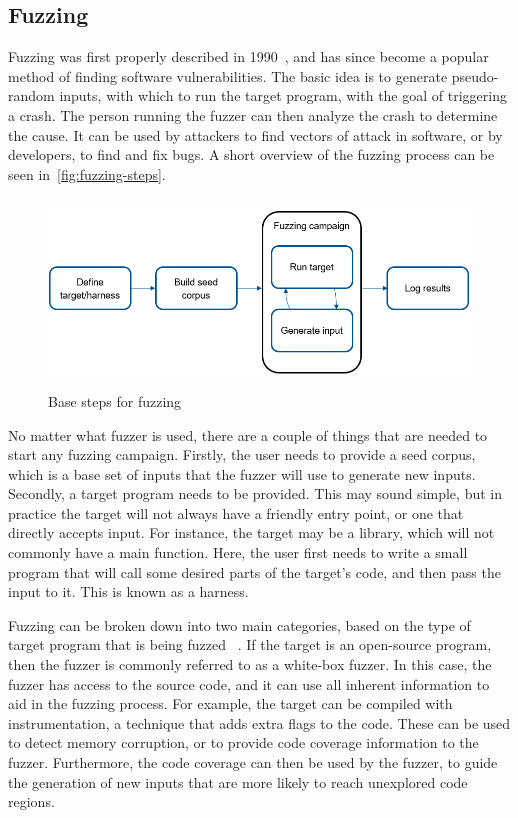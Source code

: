 \subsection{Fuzzing}
Fuzzing was first properly described in 1990~\parencite{10.1145/96267.96279}, and has since become a popular method of finding 
software vulnerabilities. The basic idea is to generate pseudo-random inputs, with which to run the target program,
with the goal of triggering a crash. The person running the fuzzer can then analyze the crash to determine the
cause. It can be used by attackers to find vectors of attack in software, or by developers, to find and fix bugs. A short
overview of the fuzzing process can be seen in~\autoref{fig:fuzzing-steps}.

\begin{figure}[htpb]
    \centering
    \includegraphics[height=50mm]{figures/fuzzing_steps.png}
    \caption[Fuzzing steps]{Base steps for fuzzing}\label{fig:fuzzing-steps}
\end{figure}

No matter what fuzzer is used, there are a couple of things that are needed to start any fuzzing campaign. Firstly,
the user needs to provide a seed corpus, which is a base set of inputs that the fuzzer will use to generate new
inputs. Secondly, a target program needs to be provided. This may sound simple, but in practice the target will not
always have a friendly entry point, or one that directly accepts input. For instance, the target may be a library,
which will not commonly have a main function. Here, the user first needs to write a small program that will call
some desired parts of the target's code, and then pass the input to it. This is known as a harness.

Fuzzing can be broken down into two main categories, based on the type of target program that is being fuzzed
~\parencite{10.1145/1292414.1292416}. If the target is an open-source program, then the fuzzer is commonly referred 
to as a white-box fuzzer. In this case, the fuzzer has access to the source code, and it can use all inherent information 
to aid in the fuzzing process. For example, the target can be compiled with instrumentation, a technique that adds extra 
flags to the code. These can be used to detect memory corruption, or to provide code coverage information to the fuzzer.
Furthermore, the code coverage can then be used by the fuzzer, to guide the generation of new inputs that are more likely
to reach unexplored code regions.

